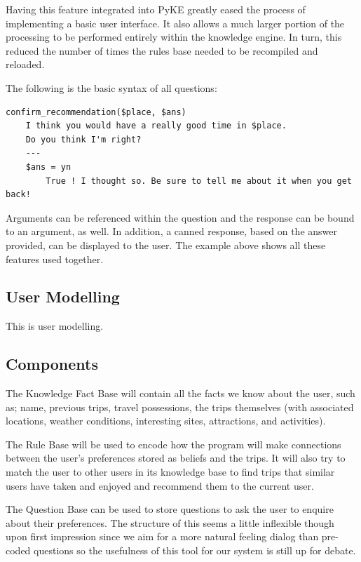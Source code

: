 \documentclass[11pt]{article} %
\begin{document}
Having this feature integrated into PyKE greatly eased the process of implementing a basic user interface. It also allows a much larger portion of the processing to be performed entirely within the knowledge engine. In turn, this reduced the number of times the rules base needed to be recompiled and reloaded.

The following is the basic syntax of all questions:
\begin{Verbatim}[xleftmargin=2.5cm]
confirm_recommendation($place, $ans)
    I think you would have a really good time in $place.
    Do you think I'm right?
    ---
    $ans = yn
        True ! I thought so. Be sure to tell me about it when you get back!
\end{Verbatim}

Arguments can be referenced within the question and the response can be bound to an argument, as well. In addition, a canned response, based on the answer provided, can be displayed to the user. The example above shows all these features used together.

\subsection{User Modelling}

This is user modelling.

\subsection{Components}

The Knowledge Fact Base will contain all the facts we
know about the user, such as; name, previous trips, travel
possessions, the trips themselves (with associated
locations, weather conditions, interesting sites,
attractions, and activities).

The Rule Base will be used to encode how the program
will make connections between the user’s preferences
stored as beliefs and the trips. It will also try to match
the user to other users in its knowledge base to find
trips that similar users have taken and enjoyed and
recommend them to the current user.

The Question Base can be used to store questions to ask
the user to enquire about their preferences. The
structure of this seems a little inflexible though
upon first impression since we aim for a more natural
feeling dialog than pre-coded questions so the usefulness
of this tool for our system is still up for debate.
\end{document}
